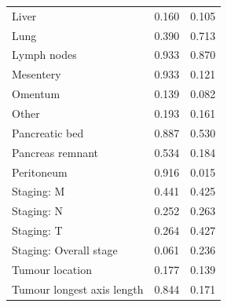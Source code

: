 \documentclass[dissertation.tex]{subfiles}
\begin{document}
\begin{table}
\begin{tabular}{@{}lll@{}}
\quad Liver                & 0.160                         & 0.105                         \\
\quad Lung                 & 0.390                         & 0.713                         \\
\quad Lymph nodes          & 0.933                         & 0.870                         \\
\quad Mesentery            & 0.933                         & 0.121                         \\
\quad Omentum              & 0.139                         & 0.082                         \\
\quad Other                & 0.193                         & 0.161                         \\
\quad Pancreatic bed       & 0.887                         & 0.530                         \\
\quad Pancreas remnant     & 0.534                         & 0.184                         \\
\quad Peritoneum           & 0.916                         & 0.015                         \\
Staging: M                 & 0.441                         & 0.425                         \\
Staging: N                 & 0.252                         & 0.263                         \\
Staging: T                 & 0.264                         & 0.427                         \\
Staging: Overall stage     & 0.061                         & 0.236                         \\
Tumour location            & 0.177                         & 0.139                         \\
Tumour longest axis length & 0.844                         & 0.171                         \\ \bottomrule
\end{tabular}
\end{table}
\end{document}
